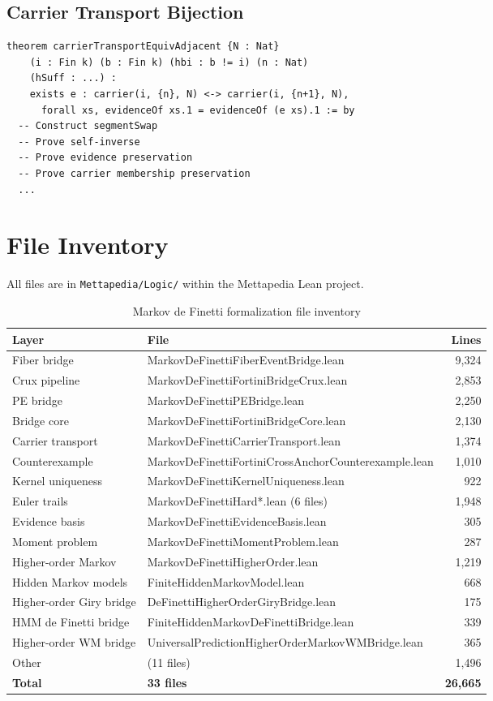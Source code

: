 \documentclass[11pt,a4paper]{article}
\theoremstyle{definition}
\begin{document}
\subsection{Carrier Transport Bijection}

\begin{lstlisting}
theorem carrierTransportEquivAdjacent {N : Nat}
    (i : Fin k) (b : Fin k) (hbi : b != i) (n : Nat)
    (hSuff : ...) :
    exists e : carrier(i, {n}, N) <-> carrier(i, {n+1}, N),
      forall xs, evidenceOf xs.1 = evidenceOf (e xs).1 := by
  -- Construct segmentSwap
  -- Prove self-inverse
  -- Prove evidence preservation
  -- Prove carrier membership preservation
  ...
\end{lstlisting}

\section{File Inventory}

All files are in \texttt{Mettapedia/Logic/} within the Mettapedia Lean project.

\begin{table}[h]
\centering
\begin{tabular}{llr}
\toprule
\textbf{Layer} & \textbf{File} & \textbf{Lines} \\
\midrule
Fiber bridge & MarkovDeFinettiFiberEventBridge.lean & 9,324 \\
Crux pipeline & MarkovDeFinettiFortiniBridgeCrux.lean & 2,853 \\
PE bridge & MarkovDeFinettiPEBridge.lean & 2,250 \\
Bridge core & MarkovDeFinettiFortiniBridgeCore.lean & 2,130 \\
Carrier transport & MarkovDeFinettiCarrierTransport.lean & 1,374 \\
Counterexample & MarkovDeFinettiFortiniCrossAnchorCounterexample.lean & 1,010 \\
Kernel uniqueness & MarkovDeFinettiKernelUniqueness.lean & 922 \\
Euler trails & MarkovDeFinettiHard*.lean (6 files) & 1,948 \\
Evidence basis & MarkovDeFinettiEvidenceBasis.lean & 305 \\
Moment problem & MarkovDeFinettiMomentProblem.lean & 287 \\
Higher-order Markov & MarkovDeFinettiHigherOrder.lean & 1,219 \\
Hidden Markov models & FiniteHiddenMarkovModel.lean & 668 \\
Higher-order Giry bridge & DeFinettiHigherOrderGiryBridge.lean & 175 \\
HMM de Finetti bridge & FiniteHiddenMarkovDeFinettiBridge.lean & 339 \\
Higher-order WM bridge & UniversalPredictionHigherOrderMarkovWMBridge.lean & 365 \\
Other & (11 files) & 1,496 \\
\midrule
\textbf{Total} & \textbf{33 files} & \textbf{26,665} \\
\bottomrule
\end{tabular}
\caption{Markov de Finetti formalization file inventory}
\end{table}
\end{document}
